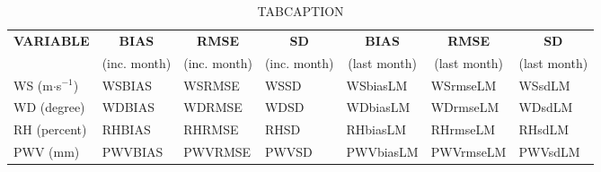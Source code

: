 \begin{table}[h!]
\begin{center}
\begin{tabular}{|l|l|l|l|l|l|l|}
\hline
\multicolumn{1}{|c|}{\cellcolor[HTML]{C0C0C0}\textbf{VARIABLE}} & \multicolumn{1}{c|}{\cellcolor[HTML]{C0C0C0}\textbf{BIAS}} & \multicolumn{1}{c|}{\cellcolor[HTML]{C0C0C0}\textbf{RMSE}} & \multicolumn{1}{c|}{\cellcolor[HTML]{C0C0C0}\textbf{SD}} & \multicolumn{1}{c|}{\cellcolor[HTML]{C0C0C0}\textbf{BIAS}} & \multicolumn{1}{c|}{\cellcolor[HTML]{C0C0C0}\textbf{RMSE}} & \multicolumn{1}{c|}{\cellcolor[HTML]{C0C0C0}\textbf{SD}}\\
\multicolumn{1}{|c|}{\cellcolor[HTML]{C0C0C0}} & \multicolumn{1}{c|}{\cellcolor[HTML]{C0C0C0}(inc. month)} & \multicolumn{1}{c|}{\cellcolor[HTML]{C0C0C0}(inc. month)} & \multicolumn{1}{c|}{\cellcolor[HTML]{C0C0C0}(inc. month)} & \multicolumn{1}{c|}{\cellcolor[HTML]{C0C0C0}(last month)} & \multicolumn{1}{c|}{\cellcolor[HTML]{C0C0C0}(last month)} & \multicolumn{1}{c|}{\cellcolor[HTML]{C0C0C0}(last month)}\\\hline
\cellcolor[HTML]{C0C0C0}WS (m$\cdot$s$^{-1}$) & WSBIAS  & WSRMSE  & WSSD  & WSbiasLM     & WSrmseLM     & WSsdLM\\
\cellcolor[HTML]{C0C0C0}WD (degree)           & WDBIAS  & WDRMSE  & WDSD  & WDbiasLM     & WDrmseLM     & WDsdLM\\
\cellcolor[HTML]{C0C0C0}RH (percent)          & RHBIAS  & RHRMSE  & RHSD  & RHbiasLM     & RHrmseLM     & RHsdLM\\
\cellcolor[HTML]{C0C0C0}PWV (mm)              & PWVBIAS & PWVRMSE & PWVSD & PWVbiasLM    & PWVrmseLM    & PWVsdLM\\
\hline
\end{tabular}
\caption{TABCAPTION}\label{MYLABEL}
\end{center}
\end{table}

